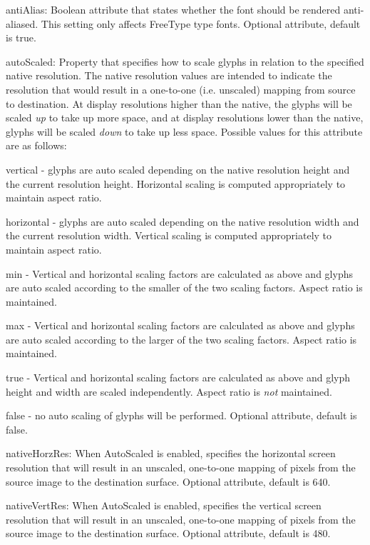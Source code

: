 \begin{DoxyItemize}
\begin{DoxyItemize}
\item {\ttfamily anti\+Alias\+:} Boolean attribute that states whether the font should be rendered anti-\/aliased. This setting only affects Free\+Type type fonts. Optional attribute, default is true.
\item {\ttfamily auto\+Scaled\+:} Property that specifies how to scale glyphs in relation to the specified native resolution. The native resolution values are intended to indicate the resolution that would result in a one-\/to-\/one (i.\+e. unscaled) mapping from source to destination. At display resolutions higher than the native, the glyphs will be scaled {\itshape up} to take up more space, and at display resolutions lower than the native, glyphs will be scaled {\itshape down} to take up less space. Possible values for this attribute are as follows\+:
\begin{DoxyItemize}
\item vertical -\/ glyphs are auto scaled depending on the native resolution height and the current resolution height. Horizontal scaling is computed appropriately to maintain aspect ratio.
\item horizontal -\/ glyphs are auto scaled depending on the native resolution width and the current resolution width. Vertical scaling is computed appropriately to maintain aspect ratio.
\item min -\/ Vertical and horizontal scaling factors are calculated as above and glyphs are auto scaled according to the smaller of the two scaling factors. Aspect ratio is maintained.
\item max -\/ Vertical and horizontal scaling factors are calculated as above and glyphs are auto scaled according to the larger of the two scaling factors. Aspect ratio is maintained.
\item true -\/ Vertical and horizontal scaling factors are calculated as above and glyph height and width are scaled independently. Aspect ratio is {\itshape not} maintained.
\item false -\/ no auto scaling of glyphs will be performed. Optional attribute, default is false.
\end{DoxyItemize}
\item {\ttfamily native\+Horz\+Res\+:} When Auto\+Scaled is enabled, specifies the horizontal screen resolution that will result in an unscaled, one-\/to-\/one mapping of pixels from the source image to the destination surface. Optional attribute, default is 640.
\item {\ttfamily native\+Vert\+Res\+:} When Auto\+Scaled is enabled, specifies the vertical screen resolution that will result in an unscaled, one-\/to-\/one mapping of pixels from the source image to the destination surface. Optional attribute, default is 480.

\end{DoxyItemize}
\end{DoxyItemize}
